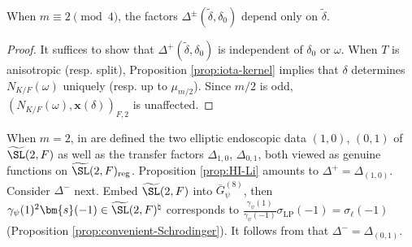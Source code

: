 \documentclass[a4paper,10pt]{article}
\begin{document}
\begin{lemma}
	When $m \equiv 2 \pmod 4$, the factors $\Delta^\pm(\tilde{\delta}, \delta_0)$ depend only on $\tilde{\delta}$.
\end{lemma}
\begin{proof}
	It suffices to show that $\Delta^+(\tilde{\delta}, \delta_0)$ is independent of $\delta_0$ or $\omega$. When $T$ is anisotropic (resp. split), Proposition \ref{prop:iota-kernel} implies that $\delta$ determines $N_{K/F}(\omega)$ uniquely (resp. up to $\mu_{m/2}$). Since $m/2$ is odd, $(N_{K/F}(\omega), \bm{x}(\delta))_{F,2}$ is unaffected.
\end{proof}

\begin{remark}
	When $m=2$, in \cite[Définition 5.9]{Li11} are defined the two elliptic endoscopic data $(1,0)$, $(0,1)$ of $\widetilde{\SL}(2,F)$ as well as the transfer factors $\Delta_{1,0}$, $\Delta_{0,1}$, both viewed as genuine functions on $\widetilde{\SL}(2,F)_\text{reg}$. Proposition \ref{prop:HI-Li} amounts to $\Delta^+ = \Delta_{(1,0)}$. Consider $\Delta^-$ next. Embed $\widetilde{\SL}(2,F)$ into $\overline{G}^{(8)}_\psi$, then $\gamma_\psi(1)^2 \bm{s}(-1) \in \widetilde{\SL}(2,F)^\natural$ corresponds to $\frac{\gamma_\psi(1)}{\gamma_\psi(-1)} \sigma_\text{LP}(-1) = \sigma_\ell(-1)$ (Proposition \ref{prop:convenient-Schrodinger}). It follows from \cite[Proposition 5.16]{Li11} that $\Delta^- = \Delta_{(0,1)}$.
\end{remark}
\end{document}
